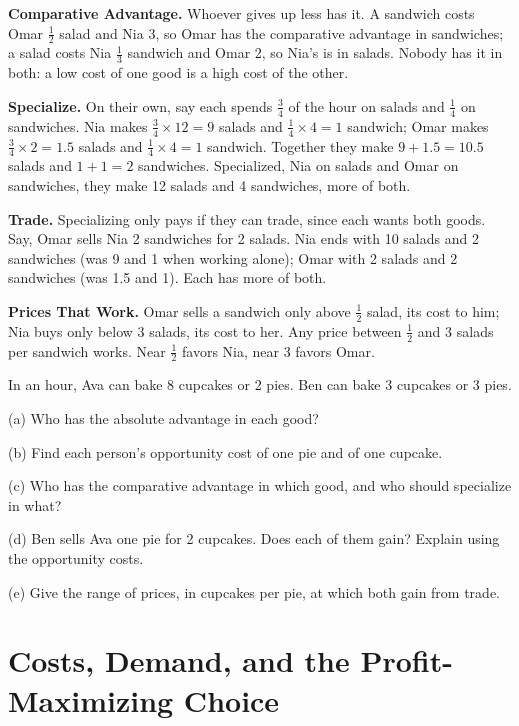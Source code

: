 \documentclass[11pt]{article}
\newcommand{\topicname}{}
\newcommand{\block}[1]{\needspace{4\baselineskip}\par\vspace{6pt}\noindent{\fontsize{13}{16}\selectfont\bfseries\color{accent}#1}\par\vspace{-5pt}\noindent{\color{accent}\rule{\linewidth}{0.4pt}}\par\vspace{1pt}}
\newcommand{\topicpage}{\clearpage\ifodd\value{page}\else\mbox{}\thispagestyle{empty}\clearpage\fi}
\newcommand{\topic}[2]{\pagestyle{topic}\renewcommand{\topicname}{#1}\section{#1}\label{topic:#1}\vspace{-6pt}{\color{muted}#2.}\par}
\renewcommand{\step}[1]{\par\vspace{1pt}\noindent\textbf{\textcolor{accent}{#1}}\enspace}
\begin{document}
\step{Comparative Advantage.} Whoever gives up less has it. A sandwich costs Omar $\tfrac{1}{2}$ salad and Nia 3, so Omar has the comparative advantage in sandwiches; a salad costs Nia $\tfrac{1}{3}$ sandwich and Omar 2, so Nia's is in salads. Nobody has it in both: a low cost of one good is a high cost of the other.

\step{Specialize.} On their own, say each spends $\tfrac{3}{4}$ of the hour on salads and $\tfrac{1}{4}$ on sandwiches. Nia makes $\tfrac{3}{4} \times 12 = 9$ salads and $\tfrac{1}{4} \times 4 = 1$ sandwich; Omar makes $\tfrac{3}{4} \times 2 = 1.5$ salads and $\tfrac{1}{4} \times 4 = 1$ sandwich. Together they make $9 + 1.5 = 10.5$ salads and $1 + 1 = 2$ sandwiches. Specialized, Nia on salads and Omar on sandwiches, they make 12 salads and 4 sandwiches, more of both.

\step{Trade.} Specializing only pays if they can trade, since each wants both goods. Say, Omar sells Nia 2 sandwiches for 2 salads. Nia ends with 10 salads and 2 sandwiches (was 9 and 1 when working alone); Omar with 2 salads and 2 sandwiches (was 1.5 and 1). Each has more of both.

\step{Prices That Work.} Omar sells a sandwich only above $\tfrac{1}{2}$ salad, its cost to him; Nia buys only below 3 salads, its cost to her. Any price between $\tfrac{1}{2}$ and 3 salads per sandwich works. Near $\tfrac{1}{2}$ favors Nia, near 3 favors Omar.

\newpage
\block{Your Turn}
In an hour, Ava can bake 8 cupcakes or 2 pies. Ben can bake 3 cupcakes or 3 pies.

(a) Who has the absolute advantage in each good?

(b) Find each person's opportunity cost of one pie and of one cupcake.

(c) Who has the comparative advantage in which good, and who should specialize in what?

(d) Ben sells Ava one pie for 2 cupcakes. Does each of them gain? Explain using the opportunity costs.

(e) Give the range of prices, in cupcakes per pie, at which both gain from trade.


\topicpage
\topic{Costs, Demand, and the Profit-Maximizing Choice}{Lectures 5, 6, and 9}
\end{document}
